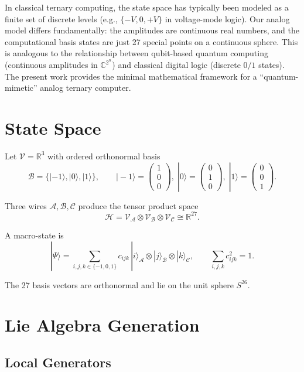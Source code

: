 \documentclass[12pt,a4paper]{article}
\begin{document}
In classical ternary computing, the state space has typically been modeled
as a finite set of discrete levels (e.g., $\{-V,0,+V\}$ in voltage-mode
logic). Our analog model differs fundamentally: the amplitudes are
continuous real numbers, and the computational basis states are just 27
special points on a continuous sphere. This is analogous to the
relationship between qubit-based quantum computing (continuous
amplitudes in $\mathbb{C}^{2^n}$) and classical digital logic (discrete
$0/1$ states). The present work provides the minimal mathematical
framework for a ``quantum-mimetic'' analog ternary computer.

\section{State Space}

Let $\mathcal{V} = \mathbb{R}^3$ with ordered orthonormal basis
\[
\mathcal{B} = \{|-1\rangle, |0\rangle, |1\rangle\},\qquad
|-1\rangle = \begin{pmatrix}1\\0\\0\end{pmatrix},\;
|0\rangle = \begin{pmatrix}0\\1\\0\end{pmatrix},\;
|1\rangle = \begin{pmatrix}0\\0\\1\end{pmatrix}.
\]

Three wires $\mathcal{A}, \mathcal{B}, \mathcal{C}$ produce the tensor
product space
\[
\mathcal{H} = \mathcal{V}_{\mathcal{A}} \otimes \mathcal{V}_{\mathcal{B}}
\otimes \mathcal{V}_{\mathcal{C}} \cong \mathbb{R}^{27}.
\]

A macro-state is
\[
|\Psi\rangle = \sum_{i,j,k \in \{-1,0,1\}} c_{ijk}\,
|i\rangle_{\mathcal{A}} \otimes |j\rangle_{\mathcal{B}} \otimes
|k\rangle_{\mathcal{C}},\qquad \sum_{i,j,k} c_{ijk}^2 = 1.
\]

The 27 basis vectors are orthonormal and lie on the unit sphere $S^{26}$.

\section{Lie Algebra Generation}

\subsection{Local Generators}
\end{document}
